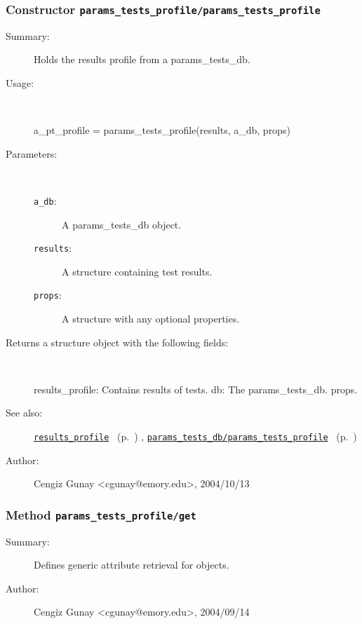 \subsubsection[Constructor \texttt{params\_tests\_profile}]{Constructor \texttt{params\_tests\_profile/params\_tests\_profile}}%
%
\label{ref_params_tests_profile__params_tests_profile}%
\hypertarget{ref_params_tests_profile__params_tests_profile}{}%
\begin{description}
\item[Summary:]Holds the results profile from a params\_tests\_db.
%
\item[Usage:]~%
\begin{lyxcode}%
a\_pt\_profile = params\_tests\_profile(results, a\_db, props)
%
\end{lyxcode}%
%
%
\item[Parameters:]~
\begin{description}%
\item[\texttt{a\_db}:]
 A params\_tests\_db object.
\item[\texttt{results}:]
 A structure containing test results.
\item[\texttt{props}:]
 A structure with any optional properties.
\end{description}%
%
\item[Returns a structure object with the following fields:]~

	results\_profile: Contains results of tests.
	db: The params\_tests\_db.
	props.
%
%
\item[See also:]%
\hyperlink{ref_results_profile}{\texttt{results\_profile}}%
\ (p.~\pageref{ref_results_profile})%
%
, \hyperlink{ref_params_tests_db__params_tests_profile}{\texttt{params\_tests\_db/params\_tests\_profile}}%
\ (p.~\pageref{ref_params_tests_db__params_tests_profile})%
%
%
\item[Author:]%
Cengiz Gunay <cgunay@emory.edu>, 2004/10/13%
\end{description}
\methodline%
\subsubsection[Method \texttt{get}]{Method \texttt{params\_tests\_profile/get}}%
%
\label{ref_params_tests_profile__get}%
\hypertarget{ref_params_tests_profile__get}{}%
\begin{description}
\item[Summary:]Defines generic attribute retrieval for objects.
%
%
%
%
%
%
%
\item[Author:]%
Cengiz Gunay <cgunay@emory.edu>, 2004/09/14%
\end{description}
\methodline%
